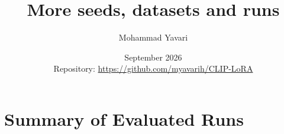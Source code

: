 \documentclass[letterpaper,11pt,leqno]{article}
\begin{document}
\title{\textbf{More seeds, datasets and runs}}
\author{Mohammad Yavari}
\date{September 2026 \\[0.5em] \small Repository: \url{https://github.com/myavarih/CLIP-LoRA}}

\begin{titlepage}
\maketitle
\end{titlepage}

\tableofcontents
\newpage

\section{Summary of Evaluated Runs}
\end{document}
